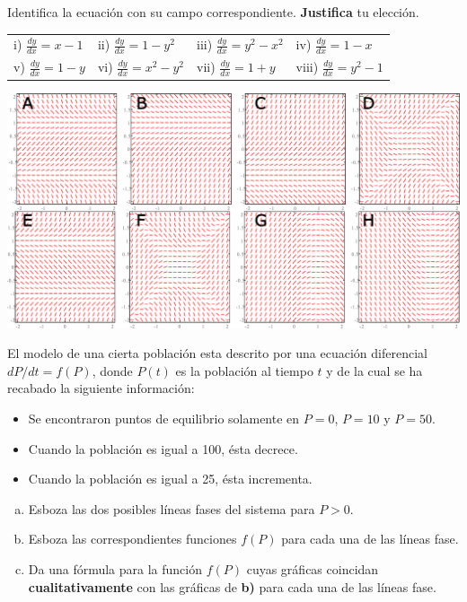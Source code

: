 \documentclass[12pt]{exam}
\begin{document}
    
    \begin{questions}
     \question
     Identifica la ecuación con su campo correspondiente. \textbf{Justifica} tu elección.
     
     \begin{tabular}{llll}
       i) $\frac{dy}{dx}=x-1$   & ii) $\frac{dy}{dx}=1-y^2$ & iii) $\frac{dy}{dx}=y^2-x^2$ & iv) $\frac{dy}{dx}=1-x$ \\
         v) $\frac{dy}{dx}=1-y$ & vi) $\frac{dy}{dx}=x^2-y^2$ & vii) $\frac{dy}{dx}=1+y$ & viii) $\frac{dy}{dx}=y^2-1$
     \end{tabular}
     
     \includegraphics[scale=.48]{F1T1.pdf}

     \question
     El modelo de una cierta población esta descrito por una ecuación diferencial $dP/dt=f(P)$, donde $P(t)$ es la población al tiempo $t$ y de la cual se ha recabado la siguiente información:
     
     \begin{itemize}
         \item Se encontraron puntos de equilibrio solamente en $P=0$, $P=10$ y $P=50$.
         \item Cuando la población es igual a 100, ésta decrece.
         \item Cuando la población es igual a 25, ésta incrementa.
     \end{itemize}
     
     \begin{enumerate}[a)]
         \item Esboza las dos posibles líneas fases del sistema para $P>0$.
         \item Esboza las correspondientes funciones $f(P)$ para cada una de las líneas fase.
         \item Da una fórmula para la función $f(P)$ cuyas gráficas coincidan \textbf{cualitativamente} con las gráficas de \textbf{b)} para cada una de las líneas fase.
     \end{enumerate}


\end{questions}
\end{document}
